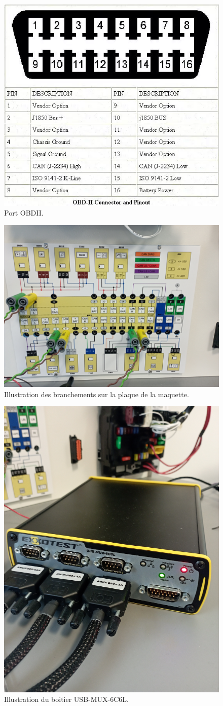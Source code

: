 \documentclass{rapportECC}
\begin{document}
\begin{figure}[H]
    \centering
    \includegraphics[width=.7\textwidth]{./images/OBDII_pins.png}
    \caption{Port OBDII.}
    \label{fig:Port_OBDII}
\end{figure}

\begin{figure}[H]
    \centering
    \includegraphics[width=.6\textwidth]{./images/tableau_interface.jpg}
    \caption{Illustration des branchements sur la plaque de la maquette.}
    \label{fig:tableau_interface}
\end{figure}

\begin{figure}[H]
    \centering
    \includegraphics[width=.6\textwidth]{./images/boitier_usb.jpg}
    \caption{Illustration du boitier USB-MUX-6C6L.}
    \label{fig:boitier_usb}
\end{figure}
\end{document}
